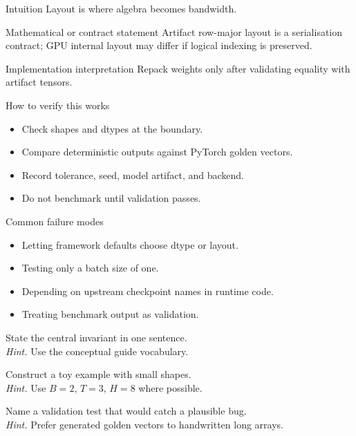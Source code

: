 \begin{intuitionbox}{Intuition}
Layout is where algebra becomes bandwidth.
\end{intuitionbox}

\begin{definitionbox}{Mathematical or contract statement}
Artifact row-major layout is a serialisation contract; GPU internal layout may differ if logical indexing is preserved.
\end{definitionbox}

\begin{implementationbox}{Implementation interpretation}
Repack weights only after validating equality with artifact tensors.
\end{implementationbox}

\begin{verificationbox}{How to verify this works}
\begin{itemize}
\item Check shapes and dtypes at the boundary.
\item Compare deterministic outputs against PyTorch golden vectors.
\item Record tolerance, seed, model artifact, and backend.
\item Do not benchmark until validation passes.
\end{itemize}
\end{verificationbox}

\begin{warningbox}{Common failure modes}
\begin{itemize}
\item Letting framework defaults choose dtype or layout.
\item Testing only a batch size of one.
\item Depending on upstream checkpoint names in runtime code.
\item Treating benchmark output as validation.
\end{itemize}
\end{warningbox}

\begin{chapterexercises}
\item State the central invariant in one sentence.\\
\textit{Hint.} Use the conceptual guide vocabulary.
\item Construct a toy example with small shapes.\\
\textit{Hint.} Use $B=2$, $T=3$, $H=8$ where possible.
\item Name a validation test that would catch a plausible bug.\\
\textit{Hint.} Prefer generated golden vectors to handwritten long arrays.
\end{chapterexercises}

